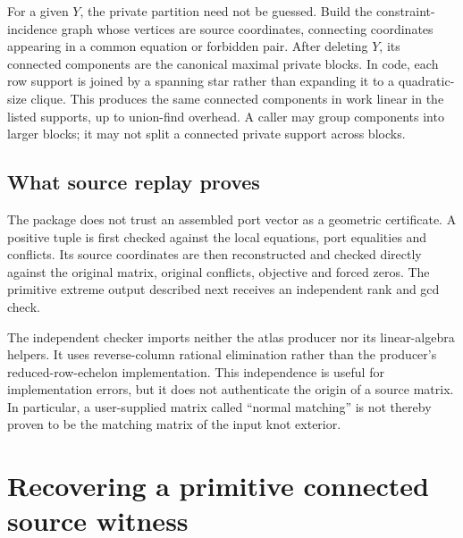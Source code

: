 For a given $Y$, the private partition need not be guessed. Build the constraint-incidence graph whose vertices are source coordinates, connecting coordinates appearing in a common equation or forbidden pair. After deleting $Y$, its connected components are the canonical maximal private blocks. In code, each row support is joined by a spanning star rather than expanding it to a quadratic-size clique. This produces the same connected components in work linear in the listed supports, up to union-find overhead. A caller may group components into larger blocks; it may not split a connected private support across blocks.

\subsection{What source replay proves}
The package does not trust an assembled port vector as a geometric certificate. A positive tuple is first checked against the local equations, port equalities and conflicts. Its source coordinates are then reconstructed and checked directly against the original matrix, original conflicts, objective and forced zeros. The primitive extreme output described next receives an independent rank and gcd check.

The independent checker imports neither the atlas producer nor its linear-algebra helpers. It uses reverse-column rational elimination rather than the producer's reduced-row-echelon implementation. This independence is useful for implementation errors, but it does not authenticate the origin of a source matrix. In particular, a user-supplied matrix called ``normal matching'' is not thereby proven to be the matching matrix of the input knot exterior.

\section{Recovering a primitive connected source witness}
\label{sec:witness}

